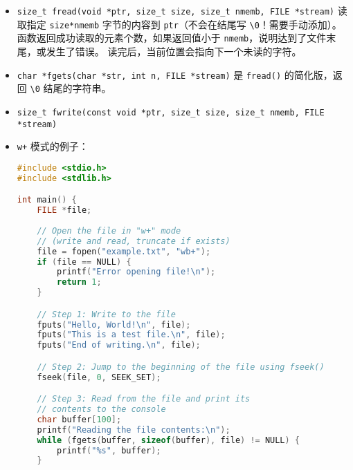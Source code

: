 \begin{itemize}
\begin{lstlisting}[language=cpp]
    // Read the bytes from start_ind
    size_t bytesRead = fread(buffer, sizeof(char), length, file);

    // Null-terminate the buffer if any data was read
    if (bytesRead > 0)
        buffer[bytesRead] = '\0';

    // Check if we reached EOF
    if (feof(file))
        printf("End of file reached.\n");
    // Check for read errors
    else if (ferror(file))
        perror("Error reading file");

    // Print the string
    printf("Read string: %s\n", buffer);

    // Free the allocated memory and close the file
    free(buffer);
    fclose(file);

    return 0;
}
\end{lstlisting}
\item \verb`size_t fread(void *ptr, size_t size, size_t nmemb, FILE *stream)` 读取指定 \verb`size*nmemb` 字节的内容到 \verb`ptr`（不会在结尾写 \verb`\0`！需要手动添加）。 函数返回成功读取的元素个数，如果返回值小于 \verb`nmemb`，说明达到了文件末尾，或发生了错误。 读完后，当前位置会指向下一个未读的字符。
\item \verb`char *fgets(char *str, int n, FILE *stream)` 是 \verb`fread()` 的简化版，返回 \verb`\0` 结尾的字符串。
\item \verb`size_t fwrite(const void *ptr, size_t size, size_t nmemb, FILE *stream)`
\item \verb`w+` 模式的例子：
\begin{lstlisting}[language=cpp]
#include <stdio.h>
#include <stdlib.h>

int main() {
    FILE *file;
    
    // Open the file in "w+" mode
    // (write and read, truncate if exists)
    file = fopen("example.txt", "wb+");
    if (file == NULL) {
        printf("Error opening file!\n");
        return 1;
    }

    // Step 1: Write to the file
    fputs("Hello, World!\n", file);
    fputs("This is a test file.\n", file);
    fputs("End of writing.\n", file);

    // Step 2: Jump to the beginning of the file using fseek()
    fseek(file, 0, SEEK_SET);

    // Step 3: Read from the file and print its
    // contents to the console
    char buffer[100];
    printf("Reading the file contents:\n");
    while (fgets(buffer, sizeof(buffer), file) != NULL) {
        printf("%s", buffer);
    }


\end{lstlisting}
\end{itemize}
